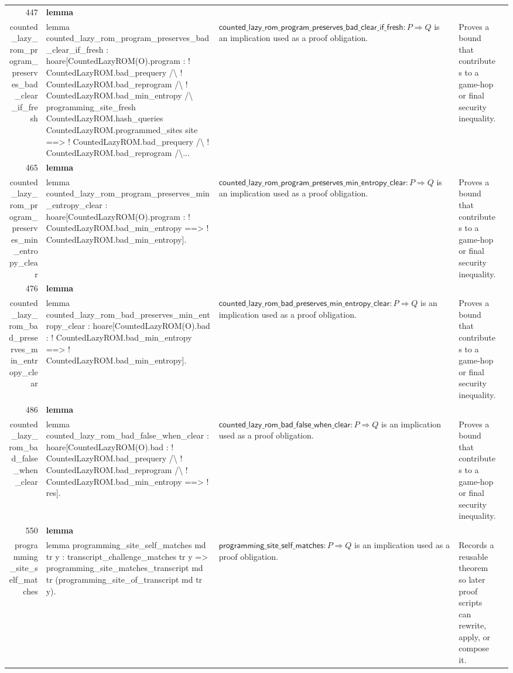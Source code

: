 \documentclass[10pt]{article}
\newcommand{\ec}[1]{\begingroup\ttfamily\scriptsize #1\endgroup}
\begin{document}
\begin{longtable}{r L{0.17\textwidth} L{0.26\textwidth} L{0.27\textwidth} L{0.20\textwidth}}
447 & \textbf{lemma}\\\ec{counted\_lazy\_rom\_program\_preserves\_bad\_clear\_if\_fresh} & \ec{lemma counted\_lazy\_rom\_program\_preserves\_bad\_clear\_if\_fresh : hoare[CountedLazyROM(O).program : ! CountedLazyROM.bad\_prequery /\textbackslash{} ! CountedLazyROM.bad\_reprogram /\textbackslash{} ! CountedLazyROM.bad\_min\_entropy /\textbackslash{} programming\_site\_fresh CountedLazyROM.hash\_queries CountedLazyROM.programmed\_sites site ==> ! CountedLazyROM.bad\_prequery /\textbackslash{} ! CountedLazyROM.bad\_reprogram /\textbackslash{}...} & \(\mathsf{counted\_lazy\_rom\_program\_preserves\_bad\_clear\_if\_fresh} : P \Rightarrow Q\) is an implication used as a proof obligation. & Proves a bound that contributes to a game-hop or final security inequality. \\
465 & \textbf{lemma}\\\ec{counted\_lazy\_rom\_program\_preserves\_min\_entropy\_clear} & \ec{lemma counted\_lazy\_rom\_program\_preserves\_min\_entropy\_clear : hoare[CountedLazyROM(O).program : ! CountedLazyROM.bad\_min\_entropy ==> ! CountedLazyROM.bad\_min\_entropy].} & \(\mathsf{counted\_lazy\_rom\_program\_preserves\_min\_entropy\_clear} : P \Rightarrow Q\) is an implication used as a proof obligation. & Proves a bound that contributes to a game-hop or final security inequality. \\
476 & \textbf{lemma}\\\ec{counted\_lazy\_rom\_bad\_preserves\_min\_entropy\_clear} & \ec{lemma counted\_lazy\_rom\_bad\_preserves\_min\_entropy\_clear : hoare[CountedLazyROM(O).bad : ! CountedLazyROM.bad\_min\_entropy ==> ! CountedLazyROM.bad\_min\_entropy].} & \(\mathsf{counted\_lazy\_rom\_bad\_preserves\_min\_entropy\_clear} : P \Rightarrow Q\) is an implication used as a proof obligation. & Proves a bound that contributes to a game-hop or final security inequality. \\
486 & \textbf{lemma}\\\ec{counted\_lazy\_rom\_bad\_false\_when\_clear} & \ec{lemma counted\_lazy\_rom\_bad\_false\_when\_clear : hoare[CountedLazyROM(O).bad : ! CountedLazyROM.bad\_prequery /\textbackslash{} ! CountedLazyROM.bad\_reprogram /\textbackslash{} ! CountedLazyROM.bad\_min\_entropy ==> ! res].} & \(\mathsf{counted\_lazy\_rom\_bad\_false\_when\_clear} : P \Rightarrow Q\) is an implication used as a proof obligation. & Proves a bound that contributes to a game-hop or final security inequality. \\
550 & \textbf{lemma}\\\ec{programming\_site\_self\_matches} & \ec{lemma programming\_site\_self\_matches md tr y : transcript\_challenge\_matches tr y => programming\_site\_matches\_transcript md tr (programming\_site\_of\_transcript md tr y).} & \(\mathsf{programming\_site\_self\_matches} : P \Rightarrow Q\) is an implication used as a proof obligation. & Records a reusable theorem so later proof scripts can rewrite, apply, or compose it. \\

\end{longtable}
\end{document}
